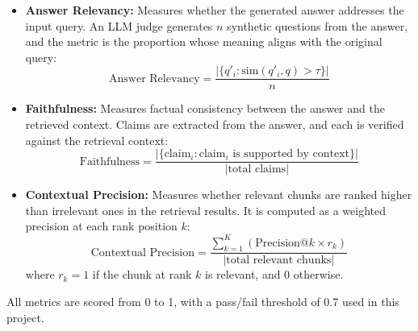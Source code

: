 \begin{itemize}
    \item \textbf{Answer Relevancy:} Measures whether the generated answer addresses the input query. An LLM judge generates $n$ synthetic questions from the answer, and the metric is the proportion whose meaning aligns with the original query:
    \begin{equation}
    \text{Answer Relevancy} = \frac{|\{q'_i : \text{sim}(q'_i, q) > \tau\}|}{n}
    \end{equation}
    
    \item \textbf{Faithfulness:} Measures factual consistency between the answer and the retrieved context. Claims are extracted from the answer, and each is verified against the retrieval context:
    \begin{equation}
    \text{Faithfulness} = \frac{|\{\text{claim}_i : \text{claim}_i \text{ is supported by context}\}|}{|\text{total claims}|}
    \end{equation}
    
    \item \textbf{Contextual Precision:} Measures whether relevant chunks are ranked higher than irrelevant ones in the retrieval results. It is computed as a weighted precision at each rank position $k$:
    \begin{equation}
    \text{Contextual Precision} = \frac{\sum_{k=1}^{K} \left(\text{Precision}@k \times r_k\right)}{|\text{total relevant chunks}|}
    \end{equation}
    where $r_k = 1$ if the chunk at rank $k$ is relevant, and 0 otherwise.
\end{itemize}

All metrics are scored from 0 to 1, with a pass/fail threshold of 0.7 used in this project.
